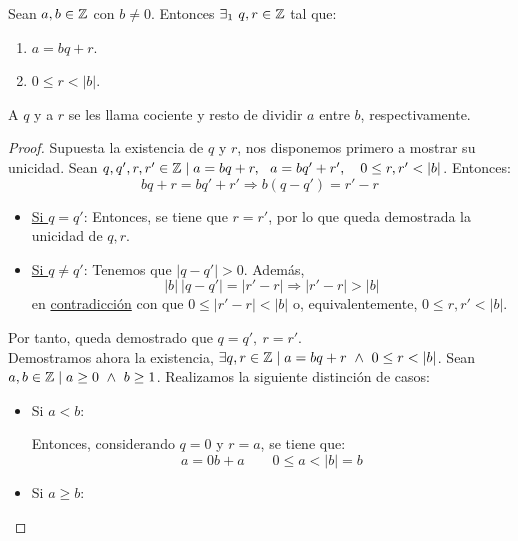 \begin{teo}
    \label{teo:AlgDivEuclides}
    Sean $a,b \in \mathbb Z$ con $b \neq 0$. Entonces $\exists_1~q,r \in \mathbb Z$ tal que:
    \begin{enumerate}
        \item $a = bq + r$.
        \item $0 \leq r < |b|$.
    \end{enumerate}
    A $q$ y a $r$ se les llama cociente y resto de dividir $a$ entre $b$, respectivamente.
\end{teo}
\begin{proof}
    Supuesta la existencia de $q$ y $r$, nos disponemos primero a mostrar su unicidad. Sean $q,q',r,r' \in \mathbb Z \mid a=bq+r,~~a=bq'+r', \quad 0 \leq r,r' < |b|$. Entonces:
    \begin{equation*}
        bq+r = bq'+r' \Longrightarrow b(q-q')=r'-r
    \end{equation*}
    \begin{itemize}
        \item \underline{Si $q=q'$}: Entonces, se tiene que $r=r'$, por lo que queda demostrada la unicidad de $q,r$.

        \item \underline{Si $q\neq q'$}: Tenemos que $|q-q'|>0$. Además,
        \begin{equation*}
            |b|~|q-q'|=|r'-r|\Longrightarrow |r'-r|>|b|
        \end{equation*}
        en \underline{contradicción} con que $0 \leq |r'-r| < |b|$ o, equivalentemente, $0\leq r,r'<|b|$.
    \end{itemize}

    Por tanto, queda demostrado que $q=q',~r=r'$.\\
    
    Demostramos ahora la existencia, $\exists q,r \in \mathbb Z \mid a=bq+r \ \land \  0\leq r < |b|$. Sean $a,b \in \mathbb Z \mid a \geq 0 \ \land \  b \geq 1$. Realizamos la siguiente distinción de casos:
    \begin{itemize}
        \item Si $a<b$:
        
            Entonces, considerando $q=0$ y $r = a$, se tiene que:
            \begin{equation*}
                a=0b+a \qquad 0\leq a < |b|=b
            \end{equation*}

        \item Si $a \geq b$:
        

\end{itemize}
\end{proof}
